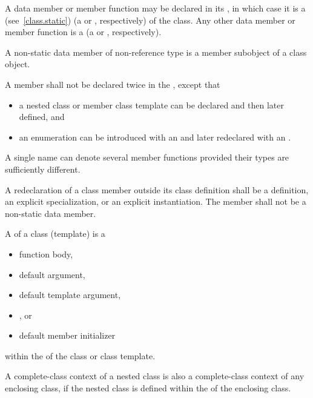 \pnum
A data member or member function
may be declared  in its ,
in which case it is a  (see~\ref{class.static})
(a  or
, respectively)
of the class.
Any other data member or member function is a 
(a  or
, respectively).
\begin{note}
A non-static data member of non-reference
type is a member subobject of a class object.
\end{note}

\pnum
A member shall not be declared twice in the
, except that
\begin{itemize}
\item a nested class or member
class template can be declared and then later defined, and
\item an
enumeration can be introduced with an  and later
redeclared with an .
\end{itemize}
\begin{note}
A single name can denote several member functions provided their types
are sufficiently different.
\end{note}

\pnum
A redeclaration of a class member outside its class definition shall be
a definition,
an explicit specialization, or
an explicit instantiation.
The member shall not be a non-static data member.

\pnum
{}%
A  of a class (template) is a
\begin{itemize}
\item function body,
\item default argument,
\item default template argument,
\item {}, or
\item default member initializer
\end{itemize}
within the  of the class or class template.
\begin{note}
A complete-class context of a nested class is also a complete-class
context of any enclosing class, if the nested class is defined within
the  of the enclosing class.
\end{note}

